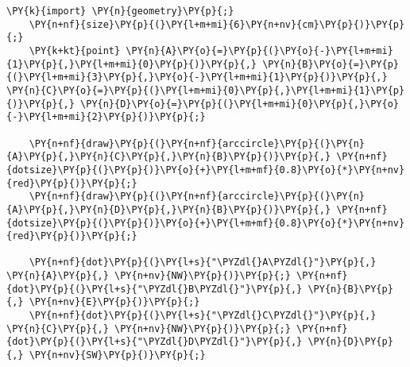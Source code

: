 \begin{Verbatim}[commandchars=\\\{\}]
    \PY{k}{import} \PY{n}{geometry}\PY{p}{;}
    \PY{n+nf}{size}\PY{p}{(}\PY{l+m+mi}{6}\PY{n+nv}{cm}\PY{p}{)}\PY{p}{;}
    \PY{k+kt}{point} \PY{n}{A}\PY{o}{=}\PY{p}{(}\PY{o}{-}\PY{l+m+mi}{1}\PY{p}{,}\PY{l+m+mi}{0}\PY{p}{)}\PY{p}{,} \PY{n}{B}\PY{o}{=}\PY{p}{(}\PY{l+m+mi}{3}\PY{p}{,}\PY{o}{-}\PY{l+m+mi}{1}\PY{p}{)}\PY{p}{,} \PY{n}{C}\PY{o}{=}\PY{p}{(}\PY{l+m+mi}{0}\PY{p}{,}\PY{l+m+mi}{1}\PY{p}{)}\PY{p}{,} \PY{n}{D}\PY{o}{=}\PY{p}{(}\PY{l+m+mi}{0}\PY{p}{,}\PY{o}{-}\PY{l+m+mi}{2}\PY{p}{)}\PY{p}{;}

    \PY{n+nf}{draw}\PY{p}{(}\PY{n+nf}{arccircle}\PY{p}{(}\PY{n}{A}\PY{p}{,}\PY{n}{C}\PY{p}{,}\PY{n}{B}\PY{p}{)}\PY{p}{,} \PY{n+nf}{dotsize}\PY{p}{(}\PY{p}{)}\PY{o}{+}\PY{l+m+mf}{0.8}\PY{o}{*}\PY{n+nv}{red}\PY{p}{)}\PY{p}{;}
    \PY{n+nf}{draw}\PY{p}{(}\PY{n+nf}{arccircle}\PY{p}{(}\PY{n}{A}\PY{p}{,}\PY{n}{D}\PY{p}{,}\PY{n}{B}\PY{p}{)}\PY{p}{,} \PY{n+nf}{dotsize}\PY{p}{(}\PY{p}{)}\PY{o}{+}\PY{l+m+mf}{0.8}\PY{o}{*}\PY{n+nv}{red}\PY{p}{)}\PY{p}{;}

    \PY{n+nf}{dot}\PY{p}{(}\PY{l+s}{"\PYZdl{}A\PYZdl{}"}\PY{p}{,} \PY{n}{A}\PY{p}{,} \PY{n+nv}{NW}\PY{p}{)}\PY{p}{;} \PY{n+nf}{dot}\PY{p}{(}\PY{l+s}{"\PYZdl{}B\PYZdl{}"}\PY{p}{,} \PY{n}{B}\PY{p}{,} \PY{n+nv}{E}\PY{p}{)}\PY{p}{;}
    \PY{n+nf}{dot}\PY{p}{(}\PY{l+s}{"\PYZdl{}C\PYZdl{}"}\PY{p}{,} \PY{n}{C}\PY{p}{,} \PY{n+nv}{NW}\PY{p}{)}\PY{p}{;} \PY{n+nf}{dot}\PY{p}{(}\PY{l+s}{"\PYZdl{}D\PYZdl{}"}\PY{p}{,} \PY{n}{D}\PY{p}{,} \PY{n+nv}{SW}\PY{p}{)}\PY{p}{;}
\end{Verbatim}
